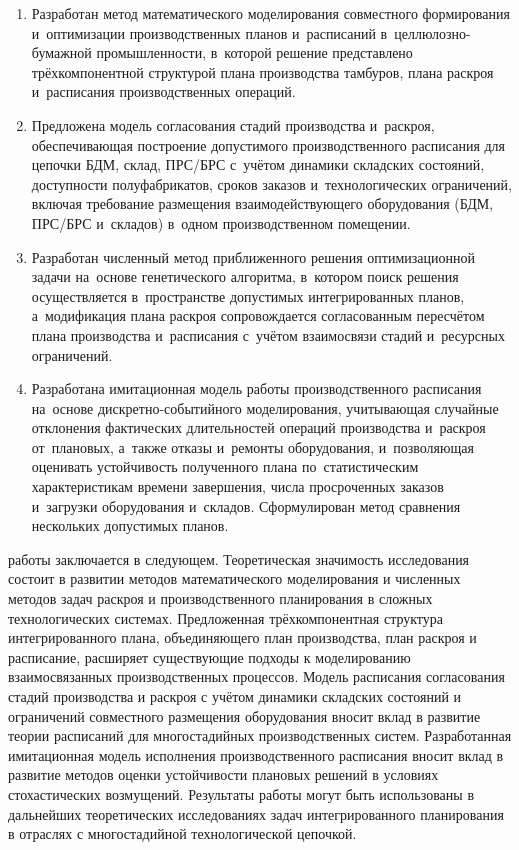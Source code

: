 {\novelty}
\begin{enumerate}[beginpenalty=10000] %
    \item Разработан метод математического моделирования совместного формирования и~оптимизации производственных планов и~расписаний в~целлюлозно-бумажной промышленности, в~которой решение представлено трёхкомпонентной структурой плана производства тамбуров, плана раскроя и~расписания производственных операций.
    \item Предложена модель согласования стадий производства и~раскроя, обеспечивающая построение допустимого производственного расписания для цепочки БДМ, склад, ПРС/БРС с~учётом динамики складских состояний, доступности полуфабрикатов, сроков заказов и~технологических ограничений, включая требование размещения взаимодействующего оборудования (БДМ, ПРС/БРС и~складов) в~одном производственном помещении.
    \item Разработан численный метод приближенного решения оптимизационной задачи на~основе генетического алгоритма, в~котором поиск решения осуществляется в~пространстве допустимых интегрированных планов, а~модификация плана раскроя сопровождается согласованным пересчётом плана производства и~расписания с~учётом взаимосвязи стадий и~ресурсных ограничений.
    \item Разработана имитационная модель работы производственного расписания на~основе дискретно-событийного моделирования, учитывающая случайные отклонения фактических длительностей операций производства и~раскроя от~плановых, а~также отказы и~ремонты оборудования, и~позволяющая оценивать устойчивость полученного плана по~статистическим характеристикам времени завершения, числа просроченных заказов и~загрузки оборудования и~складов. Сформулирован метод сравнения нескольких допустимых планов.
\end{enumerate}

{\influence} 
работы заключается в следующем. Теоретическая значимость исследования состоит в развитии методов математического моделирования и численных методов задач раскроя и производственного планирования в сложных технологических системах.
Предложенная трёхкомпонентная структура интегрированного плана, объединяющего план производства, план раскроя и расписание, расширяет существующие подходы к моделированию взаимосвязанных производственных процессов.
Модель расписания согласования стадий производства и раскроя с учётом динамики складских состояний и ограничений совместного размещения оборудования вносит вклад в развитие теории расписаний для многостадийных производственных систем.
Разработанная имитационная модель исполнения производственного расписания вносит вклад в развитие методов оценки устойчивости плановых решений в условиях стохастических возмущений.
Результаты работы могут быть использованы в дальнейших теоретических исследованиях задач интегрированного планирования в отраслях с многостадийной технологической цепочкой.

